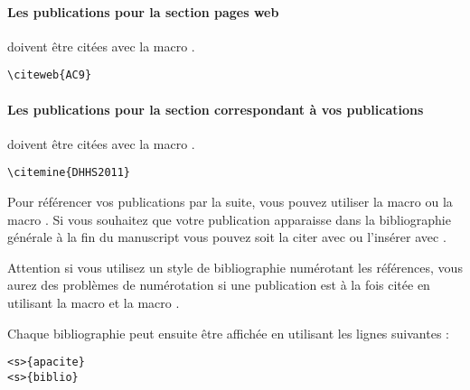 \paragraph{Les publications pour la section pages web} doivent être citées avec la macro .

\begin{framed}
\noindent{} \vspace{-0.75em}
\begin{verbatim}\citeweb{AC9}\end{verbatim}\vspace{-0.75em}
\end{framed}

\paragraph{Les publications pour la section correspondant à vos publications} doivent être citées avec la macro .

\begin{framed}
\noindent{} \vspace{-0.75em}
\begin{verbatim}\citemine{DHHS2011}\end{verbatim}\vspace{-0.75em}
\end{framed}

Pour référencer vos publications par la suite, vous pouvez utiliser la macro  ou la macro .
Si vous souhaitez que votre publication apparaisse dans la bibliographie générale à la fin du manuscript vous pouvez soit la citer avec  ou l'insérer avec . \nocite{DHHS2011}

Attention si vous utilisez un style de bibliographie numérotant les références, vous aurez des problèmes de numérotation si une publication est à la fois citée en utilisant la macro  et la macro .



Chaque bibliographie peut ensuite être affichée en utilisant les lignes suivantes :

\begin{framed}\vspace{-0.75em}
\begin{verbatim}<s>{apacite}
<s>{biblio}
\end{verbatim}\vspace{-0.75em}
\end{framed}

